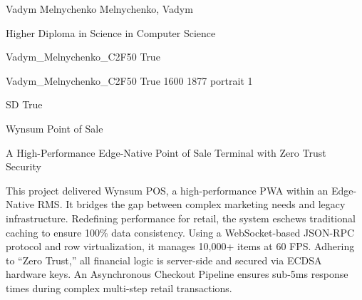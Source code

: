 \documentclass[twoside]{report}
\begin{document}
\begingroup{}\relax



\def\Key{Vadym_Melnychenko_C2F50}

{Vadym Melnychenko}
{Melnychenko, Vadym}

{Higher Diploma in Science in Computer Science}

{Vadym_Melnychenko_C2F50}
{True}

{Vadym_Melnychenko_C2F50}
{True}
{1600}
{1877}
{portrait}
{1}

{SD}
{True}

{Wynsum Point of Sale}

{A High-Performance Edge-Native Point of Sale Terminal with Zero Trust Security}

{This project delivered Wynsum POS, a high-performance PWA within an Edge-Native RMS. It bridges the gap between complex marketing needs and legacy infrastructure. Redefining performance for retail, the system eschews traditional caching to ensure 100\% data consistency. Using a WebSocket-based JSON-RPC protocol and row virtualization, it manages 10,000+ items at 60 FPS. Adhering to \textquotedblleft{}Zero Trust,\textquotedblright{} all financial logic is server-side and secured via ECDSA hardware keys. An Asynchronous Checkout Pipeline ensures sub-5ms response times during complex multi-step retail transactions.}
\end{document}
